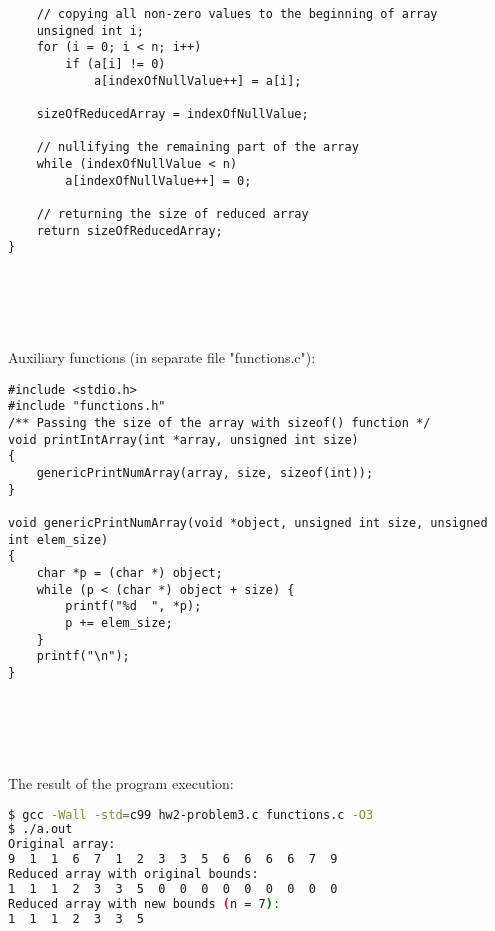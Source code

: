 \documentclass{article}
\begin{document}
\begin{verbatim}
    // copying all non-zero values to the beginning of array
    unsigned int i;
    for (i = 0; i < n; i++)
        if (a[i] != 0)
            a[indexOfNullValue++] = a[i];

    sizeOfReducedArray = indexOfNullValue;

    // nullifying the remaining part of the array
    while (indexOfNullValue < n)
        a[indexOfNullValue++] = 0;

    // returning the size of reduced array
    return sizeOfReducedArray;
}
		\end{verbatim}
		
		
\paragraph{}\
\paragraph{}\

	\rmfamily
	\noindent Auxiliary functions (in separate file "functions.c"):	
	\begin{verbatim} 
#include <stdio.h>
#include "functions.h"
/** Passing the size of the array with sizeof() function */
void printIntArray(int *array, unsigned int size)
{
    genericPrintNumArray(array, size, sizeof(int));
}

void genericPrintNumArray(void *object, unsigned int size, unsigned int elem_size) 
{
    char *p = (char *) object;
    while (p < (char *) object + size) {
        printf("%d  ", *p);
        p += elem_size;
    }
    printf("\n");
}

\end{verbatim}
		
\paragraph{}\
\paragraph{}\
		
		\rmfamily
		\noindent The result of the program execution:
		
		\ttfamily
		\begin{lstlisting}[language=bash]
$ gcc -Wall -std=c99 hw2-problem3.c functions.c -O3
$ ./a.out
Original array:
9  1  1  6  7  1  2  3  3  5  6  6  6  6  7  9
Reduced array with original bounds:
1  1  1  2  3  3  5  0  0  0  0  0  0  0  0  0
Reduced array with new bounds (n = 7):
1  1  1  2  3  3  5
		\end{lstlisting}
		
\end{document}
